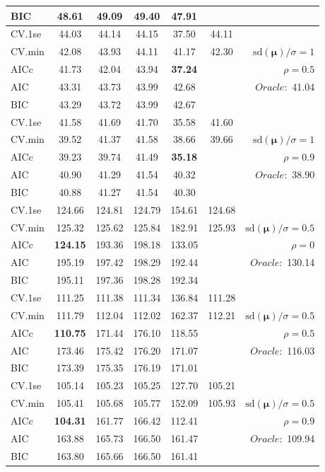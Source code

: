 \begin{table}
\begin{center}
\begin{tabular}{l*{5}{c}|r}
BIC & 48.61 & 49.09 & 49.40 & 47.91 & &  \\
 \hline 
CV.1se & 44.03 & 44.14 & 44.15 & 37.50 & 44.11 & \\
CV.min & 42.08 & 43.93 & 44.11 & 41.17 & 42.30 &  $\mathrm{sd}(\mathbf{\mu})/\sigma=1$ \\
AICc & 41.73 & 42.04 & 43.94 & {\bf 37.24} & & $\rho=0.5$ \\
AIC & 43.31 & 43.73 & 43.99 & 42.68 & &  \multirow{2}{*}{$Oracle: $ 41.04} \\
BIC & 43.29 & 43.72 & 43.99 & 42.67 & &  \\
 \hline 
CV.1se & 41.58 & 41.69 & 41.70 & 35.58 & 41.60 & \\
CV.min & 39.52 & 41.37 & 41.58 & 38.66 & 39.66 &  $\mathrm{sd}(\mathbf{\mu})/\sigma=1$ \\
AICc & 39.23 & 39.74 & 41.49 & {\bf 35.18} & & $\rho=0.9$ \\
AIC & 40.90 & 41.29 & 41.54 & 40.32 & &  \multirow{2}{*}{$Oracle: $ 38.90} \\
BIC & 40.88 & 41.27 & 41.54 & 40.30 & &  \\
 \hline 
CV.1se & 124.66 & 124.81 & 124.79 & 154.61 & 124.68 & \\
CV.min & 125.32 & 125.62 & 125.84 & 182.91 & 125.93 &  $\mathrm{sd}(\mathbf{\mu})/\sigma=0.5$ \\
AICc & {\bf 124.15} & 193.36 & 198.18 & 133.05 & & $\rho=0$ \\
AIC & 195.19 & 197.42 & 198.29 & 192.44 & &  \multirow{2}{*}{$Oracle: $ 130.14} \\
BIC & 195.11 & 197.36 & 198.28 & 192.34 & &  \\
 \hline 
CV.1se & 111.25 & 111.38 & 111.34 & 136.84 & 111.28 & \\
CV.min & 111.79 & 112.04 & 112.02 & 162.37 & 112.21 &  $\mathrm{sd}(\mathbf{\mu})/\sigma=0.5$ \\
AICc & {\bf 110.75} & 171.44 & 176.10 & 118.55 & & $\rho=0.5$ \\
AIC & 173.46 & 175.42 & 176.20 & 171.07 & &  \multirow{2}{*}{$Oracle: $ 116.03} \\
BIC & 173.39 & 175.35 & 176.19 & 171.01 & &  \\
 \hline 
CV.1se & 105.14 & 105.23 & 105.25 & 127.70 & 105.21 & \\
CV.min & 105.41 & 105.68 & 105.77 & 152.09 & 105.93 &  $\mathrm{sd}(\mathbf{\mu})/\sigma=0.5$ \\
AICc & {\bf 104.31} & 161.77 & 166.42 & 112.41 & & $\rho=0.9$ \\
AIC & 163.88 & 165.73 & 166.50 & 161.47 & &  \multirow{2}{*}{$Oracle: $ 109.94} \\
BIC & 163.80 & 165.66 & 166.50 & 161.41 & &  \\
 \hline 
\end{tabular}
\end{center}
\vspace{-1cm}
\end{table}




